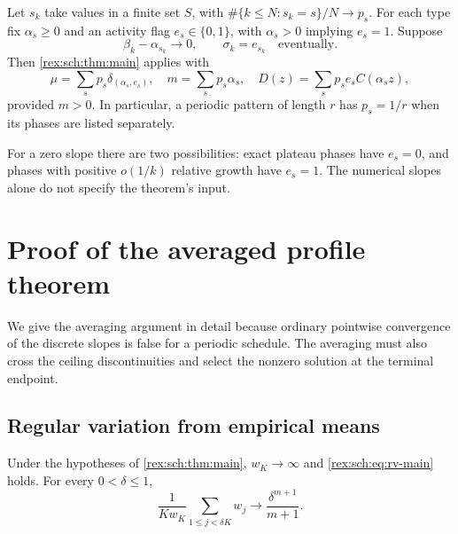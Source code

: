 \begin{corollary}\label{rex:sch:cor:finite-types}
Let $s_k$ take values in a finite set $S$, with
$\#\{k\leq N:s_k=s\}/N\to p_s$. For each type fix $\alpha_s\geq0$
and an activity flag $e_s\in\{0,1\}$, with $\alpha_s>0$ implying
$e_s=1$. Suppose
\[
 \beta_k-\alpha_{s_k}\longrightarrow0,\qquad
 \sigma_k=e_{s_k}\quad\text{eventually}.
\]
Then \cref{rex:sch:thm:main} applies with
\begin{equation}\label{rex:sch:eq:finite-drift}
 \mu=\sum_s p_s\delta_{(\alpha_s,e_s)},\quad
 m=\sum_s p_s\alpha_s,\quad
 D(z)=\sum_s p_s e_s C(\alpha_s z),
\end{equation}
provided $m>0$. In particular, a periodic pattern of length $r$ has
$p_s=1/r$ when its phases are listed separately.
\end{corollary}

For a zero slope there are two possibilities: exact plateau phases
have $e_s=0$, and phases with positive $o(1/k)$ relative growth have
$e_s=1$. The numerical slopes alone do not specify the theorem's input.

\section{Proof of the averaged profile theorem}
\label{rex:sch:sec:proof-profile}

We give the averaging argument in detail because ordinary pointwise
convergence of the discrete slopes is false for a periodic schedule.
The averaging must also cross the ceiling discontinuities and select
the nonzero solution at the terminal endpoint.

\subsection{Regular variation from empirical means}

\begin{lemma}\label{rex:sch:lem:rv}
Under the hypotheses of \cref{rex:sch:thm:main}, $w_K\to\infty$ and
\eqref{rex:sch:eq:rv-main} holds. For every $0<\delta\leq1$,
\begin{equation}\label{rex:sch:eq:weight-sum}
 \frac{1}{K w_K}\sum_{1\leq j<\delta K}w_j
 \longrightarrow\frac{\delta^{m+1}}{m+1}.
\end{equation}
\end{lemma}

